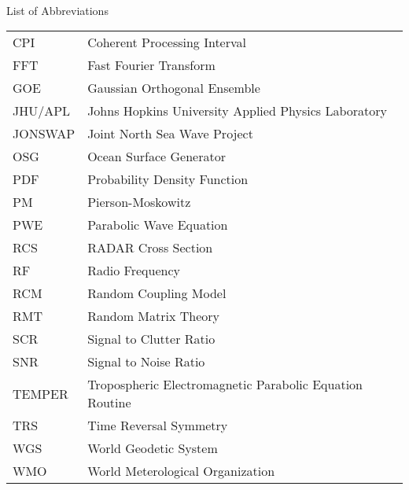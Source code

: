 

\renewcommand{\baselinestretch}{1}
\small\normalsize
\hbox{\ }

\vspace{-4em}

\begin{center}
\large{List of Abbreviations}
\end{center} 

\vspace{3pt}

\begin{supertabular}{ll}
CPI & Coherent Processing Interval \\
FFT & Fast Fourier Transform \\
GOE & Gaussian Orthogonal Ensemble \\
JHU/APL & Johns Hopkins University Applied Physics Laboratory \\
JONSWAP & Joint North Sea Wave Project\\
OSG & Ocean Surface Generator \\
PDF & Probability Density Function \\
PM & Pierson-Moskowitz \\
PWE & Parabolic Wave Equation \\
RCS & RADAR Cross Section \\
RF & Radio Frequency \\
RCM & Random Coupling Model \\
RMT & Random Matrix Theory \\
SCR & Signal to Clutter Ratio \\
SNR & Signal to Noise Ratio\\
TEMPER & Tropospheric Electromagnetic Parabolic Equation Routine \\
TRS & Time Reversal Symmetry \\
WGS & World Geodetic System \\
WMO & World Meterological Organization \\
\end{supertabular}
